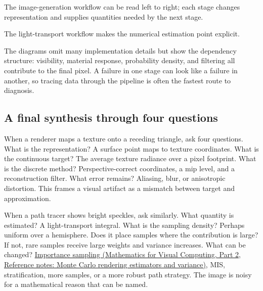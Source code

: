 \hypertarget{04-visual-computing-ii-ch034-horizontal-roadmaps}{}

The image-generation workflow can be read left to right; each stage changes representation and supplies quantities needed by the next stage.


The light-transport workflow makes the numerical estimation point explicit.


The diagrams omit many implementation details but show the dependency structure: visibility, material response, probability density, and filtering all contribute to the final pixel. A failure in one stage can look like a failure in another, so tracing data through the pipeline is often the fastest route to diagnosis.

\subsection{A final synthesis through four questions}\label{04-visual-computing-ii-ch034-a-final-synthesis-through-four-questions}

\hypertarget{04-visual-computing-ii-ch034-a-final-synthesis-through-four-questions}{}

When a renderer maps a texture onto a receding triangle, ask four questions. What is the representation? A surface point maps to texture coordinates. What is the continuous target? The average texture radiance over a pixel footprint. What is the discrete method? Perspective-correct coordinates, a mip level, and a reconstruction filter. What error remains? Aliasing, blur, or anisotropic distortion. This frames a visual artifact as a mismatch between target and approximation.

When a path tracer shows bright speckles, ask similarly. What quantity is estimated? A light-transport integral. What is the sampling density? Perhaps uniform over a hemisphere. Does it place samples where the contribution is large? If not, rare samples receive large weights and variance increases. What can be changed? \href{../02-Mathematics-for-Visual-Computing-P02/main.pdf\#appendix-031e02bf28af}{Importance sampling (Mathematics for Visual Computing, Part 2, Reference notes: Monte Carlo rendering estimators and variance)}, MIS, stratification, more samples, or a more robust path strategy. The image is noisy for a mathematical reason that can be named.

